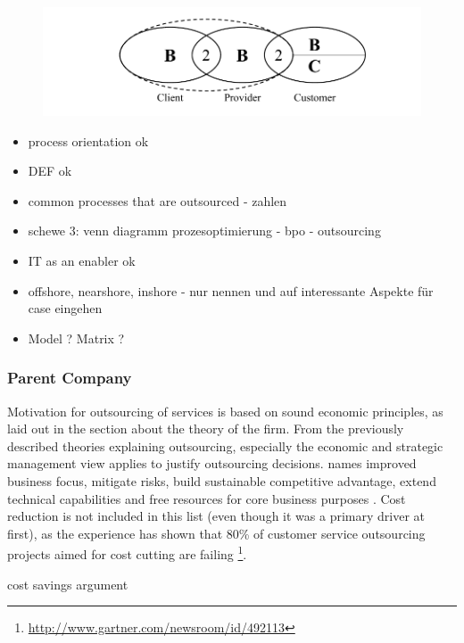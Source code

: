 		\begin{figure}[caption={BPO B2B2B/C Chain}, label={fig:bpochain}]
	{	\includegraphics[width=.8\textwidth]{figures/bpochain.pdf}}
	\end{figure}

			
		\begin{itemize}
			\item process orientation  ok
			\item DEF ok 
			\item common processes that are outsourced - zahlen
			\item schewe 3: venn diagramm prozesoptimierung - bpo - outsourcing
			
			\item IT as an enabler ok 
			\item offshore, nearshore, inshore - nur nennen und auf interessante Aspekte für case eingehen
			\item Model ? Matrix ? 
		\end{itemize}
	
		\subsubsection{Parent Company}
		Motivation for outsourcing of services is based on sound economic principles, as laid out in the section about the theory of the firm. From the previously described theories explaining outsourcing, especially the economic and strategic management view applies to justify outsourcing decisions. \citeauthor{bartell1998information} names improved business focus, mitigate risks, build sustainable competitive advantage, extend technical capabilities and free resources for core business purposes \citep{bartell1998information}. Cost reduction is not included in this list (even though it was a primary driver at first), as the experience has shown that 80\% of customer service outsourcing projects aimed for cost cutting are failing \footnote{\cf \url{http://www.gartner.com/newsroom/id/492113}}. 
		
		cost savings argument
		
